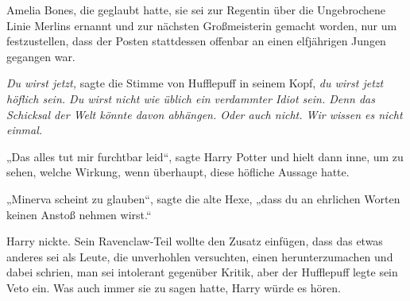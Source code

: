 Amelia Bones, die geglaubt hatte, sie sei zur Regentin über die Ungebrochene Linie Merlins ernannt und zur nächsten Großmeisterin gemacht worden, nur um festzustellen, dass der Posten stattdessen offenbar an einen elfjährigen Jungen gegangen war.

\emph{Du wirst jetzt,} sagte die Stimme von Hufflepuff in seinem Kopf, \emph{du wirst jetzt höflich sein. Du wirst nicht wie üblich ein verdammter Idiot sein. Denn das Schicksal der Welt könnte davon abhängen. Oder auch nicht. Wir wissen es nicht einmal.}

„Das alles tut mir furchtbar leid“, sagte Harry Potter und hielt dann inne, um zu sehen, welche Wirkung, wenn überhaupt, diese höfliche Aussage hatte.

„Minerva scheint zu glauben“, sagte die alte Hexe, „dass du an ehrlichen Worten keinen Anstoß nehmen wirst.“

Harry nickte.
Sein Ravenclaw-Teil wollte den Zusatz einfügen, dass das etwas anderes sei als Leute, die unverhohlen versuchten, einen herunterzumachen und dabei schrien, man sei intolerant gegenüber Kritik, aber der Hufflepuff legte sein Veto ein. Was auch immer sie zu sagen hatte, Harry würde es hören.

